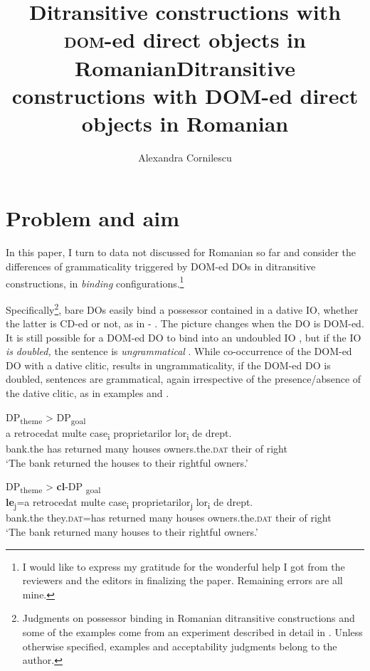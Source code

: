 \documentclass[output=paper,modfonts,nonflat,newtxmath]{langsci/langscibook}
\author{Alexandra Cornilescu\affiliation{University of Bucharest}}
\title{Ditransitive constructions with \textsc{dom}-ed direct objects in Romanian}
\title{Ditransitive constructions with DOM-ed direct objects in Romanian}
\begin{document}
\maketitle 


\section{Problem and aim} %

In this paper, I turn to data not discussed for Romanian so far and consider the differences of grammaticality triggered by DOM-ed DOs in ditransitive constructions, in \textit{binding} configurations.\footnote{I would like to express my gratitude for the wonderful help I got from the reviewers and the editors in finalizing the paper. Remaining errors are all mine.}

Specifically\footnote{Judgments on possessor binding in Romanian ditransitive constructions and some of the examples come from an experiment described in detail in \citep{CornilescuDinuTigău2017Dative}. Unless otherwise specified, examples and acceptability judgments belong to the author.}, bare DOs easily bind a possessor contained in a dative IO, whether the latter is CD-ed or not, as in  - . The picture changes when the DO is DOM-ed. It is still possible for a DOM-ed DO to bind into an undoubled IO , but if the IO \textit{is} \textit{doubled,} the sentence is \textit{ungrammatical} . While co-occurrence of the DOM-ed DO with a dative clitic, results in ungrammaticality, if the DOM-ed \textsc{DO} is doubled, sentences are grammatical, again irrespective of the presence/absence of the dative clitic, as in examples  and .

	\ea \label{ex:cornilescu:1} DP\textsubscript{theme} > DP\textsubscript{goal}\\ %
		  {a} {retrocedat}  {multe} {case\textsubscript{i}}  {proprietarilor}   {lor\textsubscript{i}}  {de} {drept.}\\
	bank.the has returned  many houses  owners.the.\textsc{dat} their of right\\
		\glt ‘The bank returned the houses to their rightful owners.’ \citep[162]{CornilescuDinuTigău2017DOC}
	\z


\ea %
    \label{ex:cornilescu:2}
    DP\textsubscript{theme} > \textbf{cl}-DP \textsubscript{goal}\\
     \textbf{{le}}{\textsubscript{j}}{=a} {retrocedat} {multe} {case\textsubscript{i}} {proprietarilor\textsubscript{j}} {lor\textsubscript{i}} {de} {drept.}\\
        bank.the they.\textsc{dat}=has returned many houses owners.the.\textsc{dat} their of right\\
    \glt ‘The bank returned many houses to their rightful owners.’ \citep[162]{CornilescuDinuTigău2017DOC}
    \z
\end{document}
